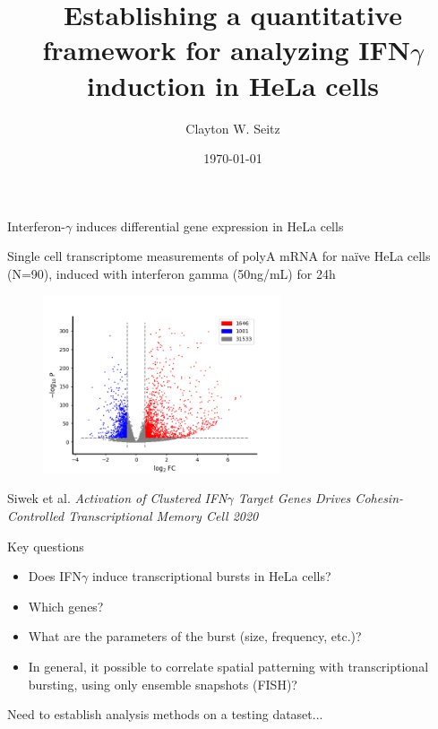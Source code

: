 \documentclass[aspectratio=1610]{beamer}					%
\title{Establishing a quantitative framework for analyzing IFN$\gamma$ induction in HeLa cells}	%
\author{Clayton W. Seitz}								%
\date{\today}									%
\begin{document}
\begin{frame}
  \titlepage
\end{frame}


%


\begin{frame}{Interferon-$\gamma$ induces differential gene expression in HeLa cells}

\vspace{0.1in}
Single cell transcriptome measurements of polyA mRNA for naïve HeLa cells (N=90), induced with interferon gamma (50ng/mL) for 24h

\begin{figure}
\includegraphics[width=7cm]{volcano.png}
\end{figure}

{\tiny Siwek et al. 
\it{Activation of Clustered IFN$\gamma$ Target Genes Drives Cohesin-Controlled Transcriptional Memory} Cell 2020}

\end{frame}

\begin{frame}{Key questions}

\begin{itemize}
\item Does IFN$\gamma$ induce transcriptional bursts in HeLa cells?
\item Which genes?
\item What are the parameters of the burst (size, frequency, etc.)?
\item In general, it possible to correlate spatial patterning with transcriptional bursting, using only ensemble snapshots (FISH)?
\end{itemize}

\vspace{1in}

Need to establish analysis methods on a testing dataset... 


\end{frame}
\end{document}
